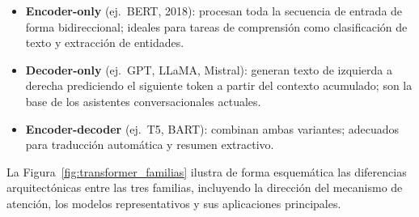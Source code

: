 \begin{itemize}
    \item \textbf{Encoder-only} (ej.\ BERT, 2018): procesan toda la secuencia de entrada de forma bidireccional; ideales para tareas de comprensión como clasificación de texto y extracción de entidades.
    \item \textbf{Decoder-only} (ej.\ GPT, LLaMA, Mistral): generan texto de izquierda a derecha prediciendo el siguiente token a partir del contexto acumulado; son la base de los asistentes conversacionales actuales.
    \item \textbf{Encoder-decoder} (ej.\ T5, BART): combinan ambas variantes; adecuados para traducción automática y resumen extractivo.
\end{itemize}

La Figura~\ref{fig:transformer_familias} ilustra de forma esquemática las diferencias arquitectónicas entre las tres familias, incluyendo la dirección del mecanismo de atención, los modelos representativos y sus aplicaciones principales.

